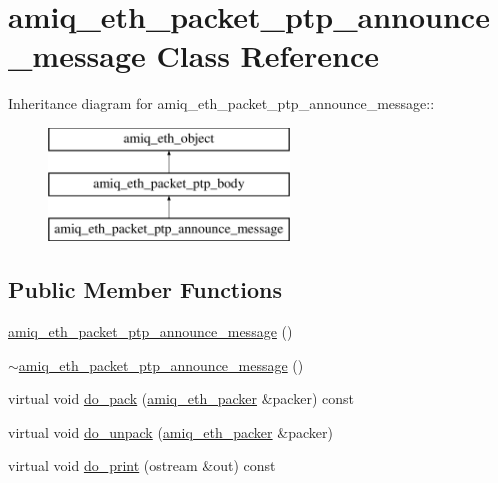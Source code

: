 \hypertarget{classamiq__eth__packet__ptp__announce__message}{
\section{amiq\_\-eth\_\-packet\_\-ptp\_\-announce\_\-message Class Reference}
\label{classamiq__eth__packet__ptp__announce__message}
}
Inheritance diagram for amiq\_\-eth\_\-packet\_\-ptp\_\-announce\_\-message::\begin{figure}[H]
\begin{center}
\leavevmode
\includegraphics[height=3cm]{classamiq__eth__packet__ptp__announce__message}
\end{center}
\end{figure}
\subsection*{Public Member Functions}
\begin{DoxyCompactItemize}
\item 
\hyperlink{classamiq__eth__packet__ptp__announce__message_a50c67961ebff6d26140d5718004e922f}{amiq\_\-eth\_\-packet\_\-ptp\_\-announce\_\-message} ()
\item 
\hyperlink{classamiq__eth__packet__ptp__announce__message_a2fb1709d53f4e22c9acaa0d78926fe82}{$\sim$amiq\_\-eth\_\-packet\_\-ptp\_\-announce\_\-message} ()
\item 
virtual void \hyperlink{classamiq__eth__packet__ptp__announce__message_a158d8eb0b4081bdfbce9d4b34be6daf7}{do\_\-pack} (\hyperlink{classamiq__eth__packer}{amiq\_\-eth\_\-packer} \&packer) const 
\item 
virtual void \hyperlink{classamiq__eth__packet__ptp__announce__message_ad5f6e496679c3ba130275b5330a23366}{do\_\-unpack} (\hyperlink{classamiq__eth__packer}{amiq\_\-eth\_\-packer} \&packer)
\item 
virtual void \hyperlink{classamiq__eth__packet__ptp__announce__message_aba766be017b0eb4137a5fac7143c598b}{do\_\-print} (ostream \&out) const 
\end{DoxyCompactItemize}
